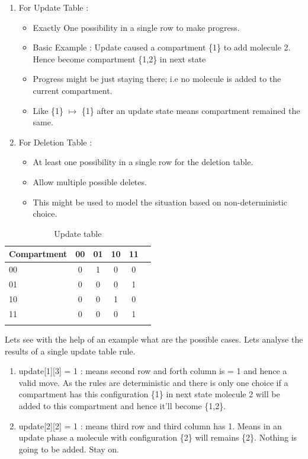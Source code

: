 \documentclass[preprint,12pt]{elsarticle}
\begin{document}
\begin{enumerate}
\item For Update Table :
\begin{itemize}
\item Exactly One possibility in a single row to make progress.
        \item Basic Example : Update caused a compartment \{1\} to add molecule 2. Hence become compartment \{1,2\} in next state 
        \item Progress might be just staying there; i.e no molecule is added to the current compartment.
\item Like \{1\} $\mapsto$ \{1\} after an update state means compartment remained the same.
\end{itemize}

\item For Deletion Table :
\begin{itemize}
\item  At least one possibility in a single row for the deletion table.
\item Allow multiple possible deletes.
\item This might be used to model the situation based on non-deterministic choice.
\end{itemize}
      
\end{enumerate}
        
\begin{table}[]
\centering       
\label{my-label}
\begin{tabular}{l*{4}{c}r}
Compartment  & 00 & 01 & 10 & 11  \\
\hline
00 & 0 & 1 & 0 & 0     \\
01            & 0 & 0 & 0 & 1     \\
10           & 0 & 0 & 1 & 0     \\
11     & 0 & 0 & 0 & 1     \\ \\ 
\end{tabular}
\caption{Update table}
\end{table}

Lets see with the help of an example what are the possible cases. Lets analyse the results of a single update table rule. 

\begin{enumerate}
\item update[1][3] = 1 : means second row and forth column is = 1 and hence a valid move. As the rules are deterministic and there is only one choice if a compartment has this configuration \{1\} in next state molecule 2 will be added to this compartment and hence it'll become \{1,2\}. 
\item update[2][2] = 1 : means third row and third column has 1. Means in an update phase a molecule with configuration \{2\} will remains \{2\}. Nothing is going to be added. Stay on. 
\end{enumerate}
\end{document}
